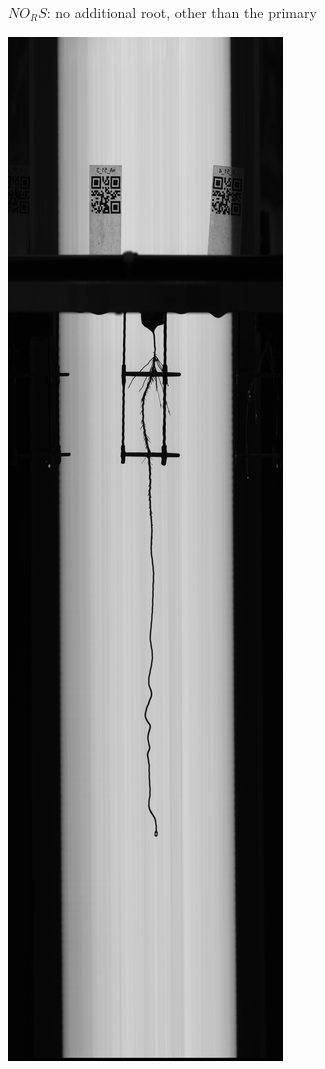 \begin{figure}
\begin{subfigure}[t]{.13\textwidth}
  \caption{$NO_RS$: no additional root, other than the primary}
  \label{fig:NO_RS}
\end{subfigure}
%
\begin{subfigure}[t]{.13\textwidth}
  \centering
  \includegraphics[width=\linewidth]{figures/NO_LS.jpg}

\end{subfigure}
\end{figure}
